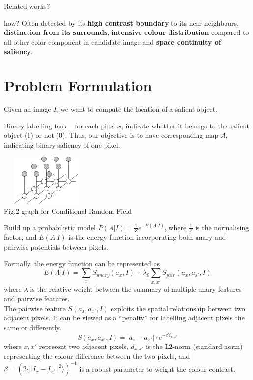\documentclass[10pt,twocolumn,letterpaper]{article}
\newcommand{\SUM}{\sum\limits}
\begin{document}
Related works?

how? Often detected by its \textbf{high contrast boundary} to its near neighbours, \textbf{distinction from its surrounds}, \textbf{intensive colour distribution} compared to all other color component in candidate image and \textbf{space continuity of saliency}. \\

\section{Problem Formulation}
Given an image $I$, we want to compute the location of a salient object.

Binary labelling task -- for each pixel $x$, indicate whether it belongs to the salient object (1) or not (0). 
Thus, our objective is to have corresponding map $A$, indicating binary saliency of one pixel.

    \begin{center}
        \includegraphics[width=1.8in,height=1in]{./Figures/mrf.jpg} \\
        \footnotesize Fig.2 graph for Conditional Random Field
        \end{center}

    Build up a probabilistic model $P(A|I)=\frac{1}{Z}e^{-E(A|I)}$, where $\frac{1}{Z}$ is the normalising factor, and $E(A|I)$ is the energy function incorporating both unary and pairwise potentials between pixels.

    Formally, the energy function can be represented as
    $$
    E(A|I) = \SUM_x S_{unary}(a_x,I) + \lambda_0 \SUM_{x,x'}S_{pair}(a_x,a_{x'},I)
    $$
    where $\lambda$ is the relative weight between the summary of multiple unary features and pairwise features. \\[10pt]
    The pairwise feature $S(a_x,a_{x'},I)$ exploits the spatial relationship between two adjacent pixels.  It can be viewed as a ``penalty'' for labelling adjacent pixels the same or differently.
    $$
    S(a_x,a_{x'},I) = |a_x-a_{x'}| \cdot e^{-\beta d_{x,x'}}
    $$
    where $x,x'$ represent two adjacent pixels, $d_{x,x'}$ is the L2-norm (standard norm) representing the colour difference between the two pixels, and $\beta=(2\langle||I_x-I_{x'}||^2\rangle)^{-1}$ is a robust parameter to weight the colour contrast.
    
\end{document}
